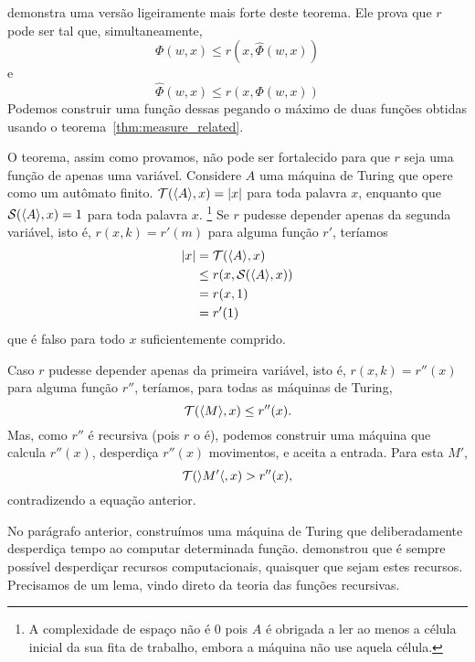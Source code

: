  demonstra uma versão ligeiramente mais forte
deste teorema.
Ele prova que $r$ pode ser tal que,
simultaneamente,
\begin{equation*}
    \Phi(w, x) \leq r( x, \hat \Phi(w, x))
\end{equation*}
e
\begin{equation*}
    \hat \Phi(w, x) \leq r( x, \Phi(w, x))
\end{equation*}
Podemos construir uma função dessas
pegando o máximo de duas funções obtidas
usando o teorema~\ref{thm:measure_related}.

O teorema,
assim como provamos,
não pode ser fortalecido
para que $r$ seja uma função de apenas uma variável.
Considere $A$ uma máquina de Turing
que opere como um autômato finito.
${\mathcal{T}}(\langle A \rangle, x) = |x|$ para toda palavra $x$,
enquanto que ${\mathcal{S}}(\langle A \rangle, x) = 1$ para toda palavra $x$.%
\footnote{
    A complexidade de espaço não é $0$
    pois $A$ é obrigada a ler
    ao menos a célula inicial da sua fita de trabalho,
    embora a máquina não use aquela célula.
}
Se $r$ pudesse depender apenas da segunda variável,
isto é, $r(x, k) = r'(m)$ para alguma função $r'$,
teríamos
\begin{align*}
    |x| &= {\mathcal{T}}(\langle A \rangle, x) \\
        &\leq r(x, {\mathcal{S}}(\langle A \rangle, x)) \\
        &= r(x, 1) \\
        &= r'(1)
\end{align*}
que é falso para todo $x$ suficientemente comprido.

Caso $r$ pudesse depender apenas da primeira variável,
isto é, $r(x, k) = r''(x)$ para alguma função $r''$,
teríamos, para todas as máquinas de Turing,
\begin{equation*}
    {\mathcal{T}}(\langle M \rangle, x) \leq r''(x).
\end{equation*}
Mas, como $r''$ é recursiva
(pois $r$ o é),
podemos construir uma máquina que calcula $r''(x)$,
desperdiça $r''(x)$ movimentos,
e aceita a entrada.
Para esta $M'$,
\begin{equation*}
    {\mathcal{T}}(\rangle M' \langle, x) > r''(x),
\end{equation*}
contradizendo a equação anterior.

No parágrafo anterior,
construímos uma máquina de Turing
que deliberadamente desperdiça tempo
ao computar determinada função.
 demonstrou que
é sempre possível desperdiçar recursos computacionais,
quaisquer que sejam estes recursos.
Precisamos de um lema,
vindo direto da teoria das funções recursivas.

